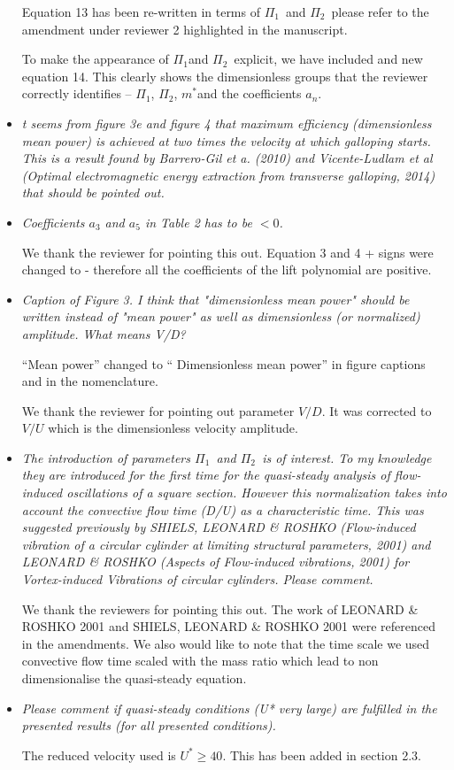 \documentclass[]{article}
\newcommand{\ustar}{\ensuremath{U^{*}}}
\newcommand{\mstar}{\ensuremath{m^{*}}}
\newcommand{\massstiff}{\ensuremath{\Pi_1}}
\newcommand{\massdamp}{\ensuremath{\Pi_2}}
\begin{document}
\begin{itemize}
	Equation 13 has been re-written in terms of \massstiff \ and \massdamp \ please refer to the amendment under reviewer 2 highlighted in the manuscript.

To make the appearance of \massstiff and \massdamp \ explicit, we have included and new equation 14. This clearly shows the dimensionless groups that the reviewer correctly identifies – \massstiff, \massdamp, \mstar and the coefficients $a_n$.

\item \emph{t seems from figure 3e and figure 4 that maximum efficiency (dimensionless mean power) is achieved at two times the velocity at which galloping starts. This is a result found by Barrero-Gil et a. (2010) and Vicente-Ludlam et al (Optimal electromagnetic energy extraction from transverse galloping, 2014) that should be pointed out.}

\item \emph{Coefficients $a_3$  and $a_5$ in Table 2 has to be $<0$.}

 We thank the reviewer for pointing this out. Equation 3 and 4 {+} signs were changed to {-} therefore all the coefficients of the lift polynomial are positive.
 
\item \emph{Caption of Figure 3. I think that "dimensionless mean power" should be written instead of "mean power" as well as dimensionless (or normalized) amplitude. What means V/D?}

“Mean power” changed to “ Dimensionless mean power” in figure captions and in the nomenclature. 

We thank the reviewer for pointing out parameter $V/D$. It was corrected to $V/U$ which is the dimensionless velocity amplitude.


\item \emph{The introduction of parameters \massstiff \ and \massdamp \ is of interest. To my knowledge they are introduced for the first time for the quasi-steady analysis of flow-induced oscillations of a square section. However this normalization takes into account the convective flow time (D/U) as a characteristic time. This was suggested previously by SHIELS, LEONARD \& ROSHKO (Flow-induced vibration of a circular cylinder at limiting
	structural parameters, 2001) and  LEONARD \& ROSHKO (Aspects of Flow-induced vibrations, 2001) for Vortex-induced Vibrations of circular cylinders. Please comment.}

We thank the reviewers for pointing this out. The work of LEONARD \& ROSHKO 2001 and SHIELS, LEONARD \& ROSHKO 2001 were referenced in the amendments. We also would like to note that the time scale we used  convective flow time scaled with the mass ratio which lead to non dimensionalise the quasi-steady equation.  



\item \emph{ Please comment if quasi-steady conditions (U* very large) are fulfilled in the presented results (for all presented conditions).}

The reduced velocity used is $\ustar \geq 40$. This has been added in section 2.3. 






\end{itemize}
\end{document}
